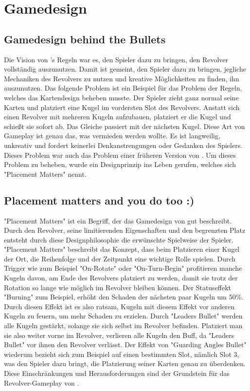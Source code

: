 
\section{Gamedesign}\label{sec:differenzierung}

\renewcommand{\kapitelautor}{Autor: Philip Jankovic} %


\subsection{Gamedesign behind the Bullets}\label{subsec:gamedesignBehindBullets}

Die Vision von \FF's Regeln war es, den Spieler dazu zu bringen, den Revolver vollständig auszunutzen. Damit ist gemeint,
den Spieler dazu zu bringen, jegliche Mechaniken des Revolvers zu nutzen und kreative Möglichkeiten zu finden, ihn auszunutzen.
Das folgende Problem ist ein Beispiel für das Problem der \FF Regeln, welches das Kartendesign beheben musste.
Der Spieler zieht ganz normal seine Karten und platziert eine Kugel im vordersten Slot des Revolvers.
Anstatt sich einen Revolver mit mehreren Kugeln aufzubauen, platziert er die Kugel und schießt sie sofort ab.
Das Gleiche passiert mit der nächsten Kugel. Diese Art von Gameplay ist genau das, was vermieden werden wollte.
Es ist langweilig, unkreativ und fordert keinerlei Denkanstrengungen oder Gedanken des Spielers.
Dieses Problem war auch das Problem einer früheren Version von \FF. Um dieses Problem zu beheben, wurde ein Designprinzip
ins Leben gerufen, welches sich "Placement Matters" nennt.


\subsection{Placement matters and you do too :)}\label{subsec:placementMatters}

"Placement Matters" ist ein Begriff, der das Gamedesign von \FF gut beschreibt. Durch den Revolver, seine limitierenden
Eigenschaften und den begrenzten Platz entsteht durch diese Designphilosophie die erwünschte Spielweise der Spieler.
"Placement Matters" beschreibt das Konzept, dass beim Platzieren einer Kugel der Ort, die Reihenfolge und der Zeitpunkt
eine wichtige Rolle spielen. Durch Trigger wie zum Beispiel "On-Rotate" oder "On-Turn-Begin" profitieren manche Kugeln davon,
am Ende des Revolvers platziert zu werden, damit sie trotz der Rotation so lange wie möglich im Revolver bleiben können.
Der Statuseffekt "Burning" zum Beispiel, erhöht den Schaden der nächsten paar Kugeln um 50\%.
Durch diesen Effekt ist es also ratsam, Kugeln mit diesem Effekt vor anderen Kugeln zu feuern, um mehr Schaden zu erzielen.
Durch "Leaders Bullet" werden alle Kugeln gestärkt, solange sie sich selbst im Revolver befinden. Platziert man sie also
weiter vorne im Revolver, verlieren alle Kugeln den Buff, da "Leaders Bullet" vor ihnen den Revolver verlässt.
Der Effekt von "Guarding Angles Bullet" wiederum bezieht sich zum Beispiel auf einen bestimmten Slot, nämlich Slot 3,
was den Spieler dazu bringt, die Platzierung seiner Karten genau zu überdenken. Diese Einschränkungen und Herausforderungen
sind der Grundstein für das Revolver-Gameplay von \FF.


